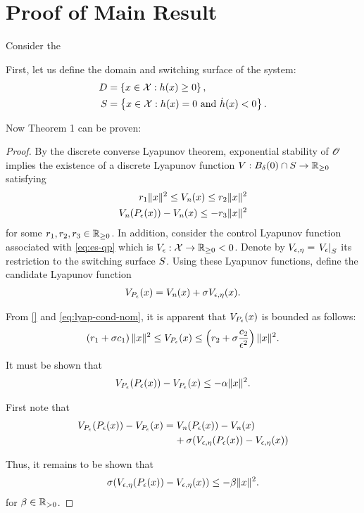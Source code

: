 \documentclass[twocolumn]{article}
\begin{document}
\section{Proof of Main Result}

Consider the 

First, let us define the domain and switching surface of the system:
\begin{align}
  \nonumber
  \D &= \left\{ x \in \X : h(x) \geq 0 \right\},\\
  \S &= \left\{ x \in \X : h(x) = 0 \mbox{ and } {\dot h}(x) < 0 \right\}.
\end{align}

Now Theorem 1 can be proven:
\begin{proof}
  By the discrete converse Lyapunov theorem, exponential stability of $\Orbit$ implies the existence of a discrete Lyapunov function $\V : B_{\delta}(0) \cap \S \to \Rnn$ satisfying
  \begin{align}
    \nonumber
    r_{1} \| x \|^{2} \leq \Vn(x) \leq r_{2} \| x \|^2\\
    \Vn(\Pe(x)) - \Vn(x) \leq -r_{3} \| x \|^{2}
    \label{eq:lyap-cond-nom}
  \end{align}
for some $r_{1}, r_{2}, r_{3} \in \Rnn$.
%
In addition, consider the control Lyapunov function associated with \eqref{eq:es-qp} which is $\Ve : \X \to \Rnn < 0$.
%
Denote by $\Vee = \VeS$ its restriction to the switching surface $\S$.
%
Using these Lyapunov functions, define the candidate Lyapunov function
\begin{align}
  \VP(x) = \Vn(x) + \sigma \Vee(x).
\end{align}

From \eqref{} and \eqref{eq:lyap-cond-nom}, it is apparent that $\VP(x)$ is bounded as follows:
\begin{align}
  \left( r_{1} + \sigma c_{1} \right) \| x \|^{2} \leq \VP(x) \leq \left( r_{2} + \sigma \frac{c_{2}}{\epsilon^{2}}  \right) \| x \|^{2}.
\end{align}

It must be shown that
\begin{align}
  \VP(\Pe(x)) - \VP(x) \leq -\alpha \| x \|^{2}.
\end{align}

First note that
\begin{align}
  \VP(\Pe(x)) - \VP(x) = \Vn(\Pe(x)) - \Vn(x) \hspace{1.2cm}\\
  \nonumber
  \mbox{} + \sigma(\Vee(\Pe(x)) - \Vee(x))
\end{align}

Thus, it remains to be shown that
\begin{align}
  \sigma(\Vee(\Pe(x)) - \Vee(x)) \leq -\beta \| x \|^{2}.
\end{align}
for $\beta \in \Rpd$.

\end{proof}
\end{document}

